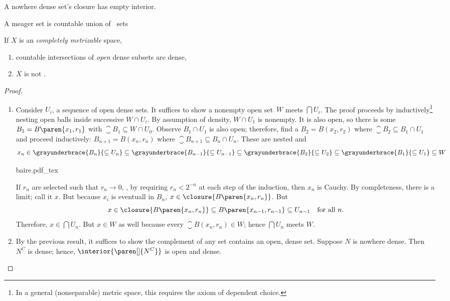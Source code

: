 \documentclass{scrartcl}
\newcommand{\ball}{B}
\begin{document}
\begin{defn}\label{nowhere-dense}
  A nowhere dense set's closure has empty interior.
\end{defn}
\begin{defn}[meager]\label{meager}
  A meager set is countable union of ~sets
\end{defn}
\begin{theorem}\label{baire category}
  If \(X\) is an \emph{completely metrizable} space,
  \begin{enumerate}
  \item countable intersections of \emph{open} dense subsets are dense,
  \item \(X\) is not .
  \end{enumerate}
\end{theorem}
\begin{proof}
  \begin{enumerate}
  \item
    Consider \(U_i\), a sequence of open dense sets. It suffices to show a nonempty open set~\(W\)
    meets \(\bigcap U_i\). The proof proceeds by inductively\footnote{In a general (nonseparable) metric space, this requires the axiom of dependent choice.} nesting open balls inside successive \(W\cap U_i\). By assumption of density, \(W\cap U_1\) is nonempty. It is also open, so there is some \(\ball_1= \ball\paren{x_1,r_1}\) with \(\closure{\ball_1}\subseteq W\cap U_0\). Observe \(\ball_1\cap U_1\) is also open; therefore, find a \(\ball_2=\ball(x_2,r_2)\) where \(\closure{\ball_2}\subseteq \ball_1\cap U_1\) and proceed inductively: \(\ball_{n+1}=\ball(x_{n},r_{n})\) where \(\closure{\ball_{n+1}}\subseteq \ball_n\cap U_n\). These are nested and
    \[
      x_n \in \grayunderbrace{\ball_n}{\subseteq U_n}\subseteq \grayunderbrace{\ball_{n-1}}{\subseteq U_{n-1}} \subseteq  \grayunderbrace{\ball_2}{\subseteq U_2} \subseteq \grayunderbrace{\ball_1}{\subseteq U_1} \subseteq W
    \]
    \begin{center}
      {baire.pdf_tex}
    \end{center}
    If \(r_n\) are selected such that \(r_n\to 0\), \eg, by requiring \(r_n < 2^{-n}\) at each step of the induction,
    then \(x_n\) is Cauchy. By completeness, there is a limit; call it \(x\). But because \(x_i\) is eventuall in \(\ball_n\), \(x\in \closure{\ball\paren{x_n,r_n}}\). But \[x\in\closure{\ball\paren{x_n,r_n}}\subseteq \ball\paren{x_{n-1},r_{n-1}}\subseteq U_{n-1} \quad \text{for all \(n\).}\]
    Therefore, \(x\in \bigcap U_n\). But \(x\in W\) as well because every \(\closure{\ball(x_n,r_n)}\in W\); hence \(\bigcap U_n\) meets \(W\).
  \item By the previous result, it suffices to show the complement of any  set contains an open, dense set.
    Suppose \(N\) is nowhere dense. Then \(N^C\) is dense; hence, \(\interior{\paren[]{N^C}}\) is open and dense.
  \end{enumerate}
\end{proof}
\end{document}
